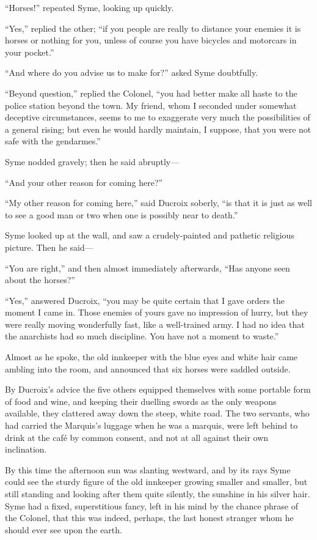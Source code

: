 “Horses!” repeated Syme, looking up quickly.

“Yes,” replied the other; “if you people are really to distance your enemies it is horses or nothing for you, unless of course you have bicycles and motorcars in your pocket.”

“And where do you advise us to make for?” asked Syme doubtfully.

“Beyond question,” replied the Colonel, “you had better make all haste to the police station beyond the town. My friend, whom I seconded under somewhat deceptive circumstances, seems to me to exaggerate very much the possibilities of a general rising; but even he would hardly maintain, I suppose, that you were not safe with the gendarmes.”

Syme nodded gravely; then he said abruptly⁠—

“And your other reason for coming here?”

“My other reason for coming here,” said Ducroix soberly, “is that it is just as well to see a good man or two when one is possibly near to death.”

Syme looked up at the wall, and saw a crudely-painted and pathetic religious picture. Then he said⁠—

“You are right,” and then almost immediately afterwards, “Has anyone seen about the horses?”

“Yes,” answered Ducroix, “you may be quite certain that I gave orders the moment I came in. Those enemies of yours gave no impression of hurry, but they were really moving wonderfully fast, like a well-trained army. I had no idea that the anarchists had so much discipline. You have not a moment to waste.”

Almost as he spoke, the old innkeeper with the blue eyes and white hair came ambling into the room, and announced that six horses were saddled outside.

By Ducroix’s advice the five others equipped themselves with some portable form of food and wine, and keeping their duelling swords as the only weapons available, they clattered away down the steep, white road. The two servants, who had carried the Marquis’s luggage when he was a marquis, were left behind to drink at the café by common consent, and not at all against their own inclination.

By this time the afternoon sun was slanting westward, and by its rays Syme could see the sturdy figure of the old innkeeper growing smaller and smaller, but still standing and looking after them quite silently, the sunshine in his silver hair. Syme had a fixed, superstitious fancy, left in his mind by the chance phrase of the Colonel, that this was indeed, perhaps, the last honest stranger whom he should ever see upon the earth.

